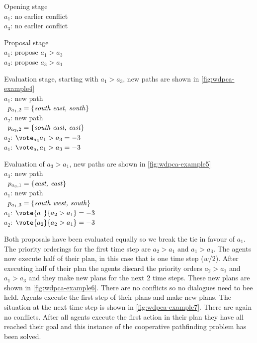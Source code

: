 Opening stage
\\ \-\qquad $a_1$: no earlier conflict
\\ \-\qquad $a_3$: no earlier conflict

Proposal stage
\\ \-\qquad $a_1$: propose $a_1 > a_3$
\\ \-\qquad $a_3$: propose $a_3 > a_1$

Evaluation stage, starting with $a_1 > a_3$, new paths are shown in 
\autoref{fig:wdpca-example4}
\\ \-\qquad $a_1$: new path
\\ \-\qquad\quad\,\; $p_{a_1,2} = \{\text{\emph{south east, south}}\}$
\\ \-\qquad $a_2$: new path
\\ \-\qquad\quad\,\; $p_{a_3,2} = \{\text{\emph{south east, east}}\}$
\\ \-\qquad $a_2$: $\vote_{a_3}{a_1 > a_3} = -3$
\\ \-\qquad $a_1$: $\vote_{a_1}{a_1 > a_3} = -3$

Evaluation of $a_3 > a_1$, new paths are shown in \autoref{fig:wdpca-example5}
\\ \-\qquad $a_3$: new path
\\ \-\qquad\quad\,\; $p_{a_3,1} = \{\text{\emph{east, east}}\}$
\\ \-\qquad $a_1$: new path
\\ \-\qquad\quad\,\; $p_{a_1,3} = \{\text{\emph{south west, south}}\}$
\\ \-\qquad $a_1$: $\vote{a_1}{a_2 > a_1} = -3$
\\ \-\qquad $a_2$: $\vote{a_2}{a_2 > a_1} = -3$

Both proposals have been evaluated equally so we break the tie in favour of 
$a_1$. The priority orderings for the first time step are $a_2 > a_1$ and $a_1 
> a_3$. The agents now execute half of their plan, in this case that is one 
time step ($w/2$). After executing half of their plan the agents discard the 
priority orders $a_2 > a_1$ and $a_1 > a_3$ and they make new plans for the 
next 2 time steps. These new plans are shown in \autoref{fig:wdpca-example6}. 
There are no conflicts so no dialogues need to bee held. Agents execute the 
first step of their plans and make new plans. The situation at the next time 
step is shown in \autoref{fig:wdpca-example7}. There are again no conflicts. 
After all agents execute the first action in their plan they have all reached 
their goal and this instance of the cooperative pathfinding problem has been 
solved.

